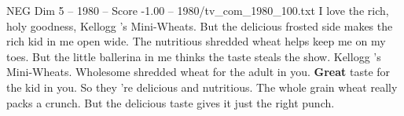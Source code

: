 \begin{textsample}{NEG Dim 5 – 1980 – Score -1.00 – 1980/tv\_com\_1980\_100.txt}  \label{ex:f5_neg_090}
I love the rich, holy goodness, Kellogg 's Mini-Wheats.
But the delicious frosted side makes the rich kid in me open wide.
The nutritious shredded wheat helps keep me on my toes.
But the little ballerina in me thinks the taste steals the show.
Kellogg 's Mini-Wheats.
Wholesome shredded wheat for the adult in you. \textbf{Great} taste for the kid in you.
So they 're delicious and nutritious.
The whole grain wheat really packs a crunch.
But the delicious taste gives it just the right punch.

\end{textsample}
